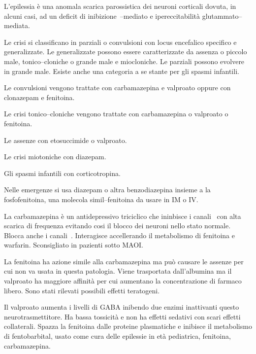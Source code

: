 L'epilessia è una anomala scarica parossistica dei neuroni corticali dovuta, in alcuni casi, ad un deficit di inibizione~--mediato e ipereccitabilità glutammato--mediata.

Le crisi si classificano in parziali o convulsioni con locus encefalico specifico e generalizzate. Le generalizzate possono essere caratterizzate da assenza o piccolo male, tonico--cloniche o grande male e miocloniche. Le parziali possono evolvere in grande male. Esiste anche una categoria a se stante per gli spasmi infantili.

Le convulsioni vengono trattate con carbamazepina e valproato oppure con clonazepam e fenitoina. 

Le crisi tonico--cloniche vengono trattate con carbamazepina o valproato o fenitoina.

Le assenze con etosuccimide o valproato.

Le crisi miotoniche con diazepam.

Gli spasmi infantili con corticotropina.

Nelle emergenze si usa diazepam o altra benzodiazepina insieme a la fosfofenitoina, una molecola simil--fenitoina da usare in IM o IV.

La carbamazepina è un antidepressivo triciclico che ininbisce i canali~ con alta scarica di frequenza evitando cosi il blocco dei neuroni nello stato normale. Blocca anche i canali~. Interagisce accellerando il metabolismo di fenitoina e warfarin. Sconsigliato in pazienti sotto MAOI. 

La fenitoina ha azione simile alla carbamazepina ma può causare le assenze per cui non va usata in questa patologia. Viene trasportata dall'albumina ma il valproato ha maggiore affinità per cui aumentano la concentrazione di farmaco libero. Sono stati rilevati possibili effetti teratogeni.

Il valproato aumenta i livelli di GABA inibendo due enzimi inattivanti questo neurotrasmettitore. Ha bassa tossicità e non ha effetti sedativi con scari effetti collaterali. Spazza la fenitoina dalle proteine plasmatiche e inibisce il metabolismo di fentobarbital, usato come cura delle epilessie in età pediatrica, fenitoina, carbamazepina.

